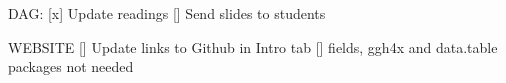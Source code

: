 ﻿DAG:
[x] Update readings
[] Send slides to students

WEBSITE
[] Update links to Github in Intro tab
[] fields, ggh4x and data.table packages not needed
